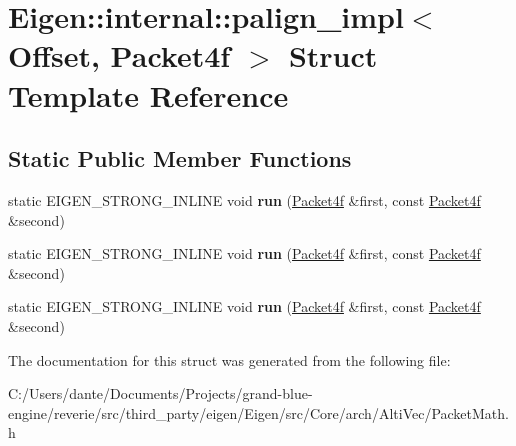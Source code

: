 \hypertarget{struct_eigen_1_1internal_1_1palign__impl_3_01_offset_00_01_packet4f_01_4}{}\section{Eigen\+::internal\+::palign\+\_\+impl$<$ Offset, Packet4f $>$ Struct Template Reference}
\label{struct_eigen_1_1internal_1_1palign__impl_3_01_offset_00_01_packet4f_01_4}
\subsection*{Static Public Member Functions}
\begin{DoxyCompactItemize}
\item 
\mbox{\label{struct_eigen_1_1internal_1_1palign__impl_3_01_offset_00_01_packet4f_01_4_a150fdb800bfa363cd70cc65dc9e524bc}} 
static E\+I\+G\+E\+N\+\_\+\+S\+T\+R\+O\+N\+G\+\_\+\+I\+N\+L\+I\+NE void {\bfseries run} (\mbox{\hyperlink{struct_eigen_1_1internal_1_1_packet4f}{Packet4f}} \&first, const \mbox{\hyperlink{struct_eigen_1_1internal_1_1_packet4f}{Packet4f}} \&second)
\item 
\mbox{\label{struct_eigen_1_1internal_1_1palign__impl_3_01_offset_00_01_packet4f_01_4_a150fdb800bfa363cd70cc65dc9e524bc}} 
static E\+I\+G\+E\+N\+\_\+\+S\+T\+R\+O\+N\+G\+\_\+\+I\+N\+L\+I\+NE void {\bfseries run} (\mbox{\hyperlink{struct_eigen_1_1internal_1_1_packet4f}{Packet4f}} \&first, const \mbox{\hyperlink{struct_eigen_1_1internal_1_1_packet4f}{Packet4f}} \&second)
\item 
\mbox{\label{struct_eigen_1_1internal_1_1palign__impl_3_01_offset_00_01_packet4f_01_4_a150fdb800bfa363cd70cc65dc9e524bc}} 
static E\+I\+G\+E\+N\+\_\+\+S\+T\+R\+O\+N\+G\+\_\+\+I\+N\+L\+I\+NE void {\bfseries run} (\mbox{\hyperlink{struct_eigen_1_1internal_1_1_packet4f}{Packet4f}} \&first, const \mbox{\hyperlink{struct_eigen_1_1internal_1_1_packet4f}{Packet4f}} \&second)
\end{DoxyCompactItemize}


The documentation for this struct was generated from the following file\+:\begin{DoxyCompactItemize}
\item 
C\+:/\+Users/dante/\+Documents/\+Projects/grand-\/blue-\/engine/reverie/src/third\+\_\+party/eigen/\+Eigen/src/\+Core/arch/\+Alti\+Vec/Packet\+Math.\+h\end{DoxyCompactItemize}
